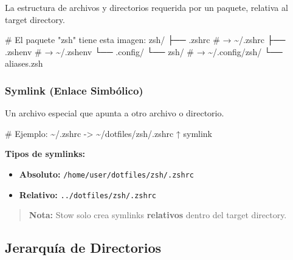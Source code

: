 \documentclass[
  doc,
  floatsintext,
  longtable,
  a4paper,
  nolmodern,
  notxfonts,
  notimes,
  12pt,
  colorlinks=true,linkcolor=blue,citecolor=blue,urlcolor=blue]{apa7}
\newenvironment{Shaded}{\begin{snugshade}}{\end{snugshade}}
\newcommand{\AttributeTok}[1]{\textcolor[rgb]{0.40,0.45,0.13}{#1}}
\newcommand{\CommentTok}[1]{\textcolor[rgb]{0.37,0.37,0.37}{#1}}
\newcommand{\ExtensionTok}[1]{\textcolor[rgb]{0.00,0.23,0.31}{#1}}
\newcommand{\NormalTok}[1]{\textcolor[rgb]{0.00,0.23,0.31}{#1}}
\newcommand{\OperatorTok}[1]{\textcolor[rgb]{0.37,0.37,0.37}{#1}}
\providecommand{\tightlist}{%
  \setlength{\itemsep}{0pt}\setlength{\parskip}{0pt}}
\begin{document}
La estructura de archivos y directorios requerida por un paquete,
relativa al target directory.

\begin{Shaded}
\begin{Highlighting}[]
\CommentTok{\# El paquete "zsh" tiene esta imagen:}
\ExtensionTok{zsh/}
\ExtensionTok{├──}\NormalTok{ .zshrc          }\CommentTok{\# → \textasciitilde{}/.zshrc}
\ExtensionTok{├──}\NormalTok{ .zshenv         }\CommentTok{\# → \textasciitilde{}/.zshenv}
\ExtensionTok{└──}\NormalTok{ .config/}
    \ExtensionTok{└──}\NormalTok{ zsh/        }\CommentTok{\# → \textasciitilde{}/.config/zsh/}
        \ExtensionTok{└──}\NormalTok{ aliases.zsh}
\end{Highlighting}
\end{Shaded}

\subsubsection{Symlink (Enlace
Simbólico)}\label{symlink-enlace-simbuxf3lico}

Un archivo especial que apunta a otro archivo o directorio.

\begin{Shaded}
\begin{Highlighting}[]
\CommentTok{\# Ejemplo:}
\ExtensionTok{\textasciitilde{}/.zshrc} \AttributeTok{{-}}\OperatorTok{\textgreater{}}\NormalTok{ \textasciitilde{}/dotfiles/zsh/.zshrc}
         \ExtensionTok{↑}
      \ExtensionTok{symlink}
\end{Highlighting}
\end{Shaded}

\textbf{Tipos de symlinks:}

\begin{itemize}
\tightlist
\item
  \textbf{Absoluto:} \texttt{/home/user/dotfiles/zsh/.zshrc}
\item
  \textbf{Relativo:} \texttt{../dotfiles/zsh/.zshrc}
\end{itemize}

\begin{quote}
\textbf{Nota:} Stow solo crea symlinks \textbf{relativos} dentro del
target directory.
\end{quote}

\subsection{Jerarquía de Directorios}\label{jerarquuxeda-de-directorios}
\end{document}
